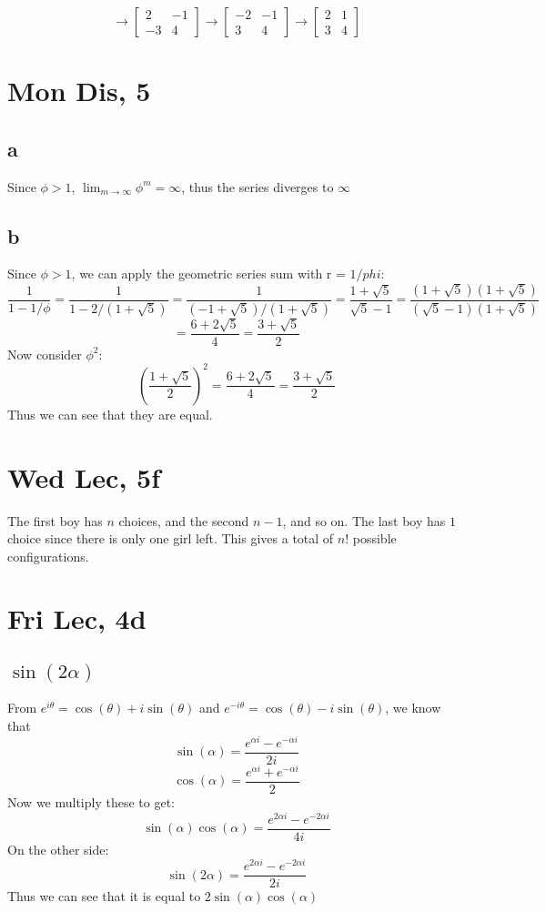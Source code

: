 \documentclass[12pt]{article}
\begin{document}
$$
\to
\begin{bmatrix}
2 & -1\\
-3 & 4
\end{bmatrix}
\to
\begin{bmatrix}
-2 & -1\\
3 & 4
\end{bmatrix}
\to
\begin{bmatrix}
2 & 1\\
3 & 4
\end{bmatrix}
$$

\section{Mon Dis, 5}
\subsection{a}
Since $\phi>1$, $\lim_{m\to \infty} \phi^m = \infty$, thus the series diverges to $\infty$

\subsection{b}
Since $\phi>1$, we can apply the geometric series sum with r = $1/phi$:
$$\frac{1}{1-1/\phi} = \frac{1}{1-2/(1+\sqrt5)} = \frac{1}{(-1+\sqrt5)/(1+\sqrt5)} = \frac{1+\sqrt5}{\sqrt5-1} = \frac{(1+\sqrt5)(1+\sqrt5)}{(\sqrt5-1)(1+\sqrt5)}$$
$$=\frac{6+2\sqrt5}{4} = \frac{3+\sqrt5}{2}$$
Now consider $\phi^2$:
$$(\frac{1+\sqrt5}{2})^2 = \frac{6+2\sqrt5}{4} = \frac{3+\sqrt5}{2}$$
Thus we can see that they are equal.
\newpage


\section{Wed Lec, 5f}
The first boy has $n$ choices, and the second $n-1$, and so on. The last boy has $1$ choice since there is only one girl left. This gives a total of $n!$ possible configurations.
\newpage

\section{Fri Lec, 4d}
\subsection{$\sin(2\alpha)$}
From $e^{i\theta}=\cos(\theta)+i\sin(\theta)$ and $e^{-i\theta}=\cos(\theta)-i\sin(\theta)$,
we know that
$$\sin(\alpha)=\frac{e^{\alpha i}-e^{-\alpha i}}{2i}$$
$$\cos(\alpha)=\frac{e^{\alpha i}+e^{-\alpha i}}{2}$$
Now we multiply these to get:
$$\sin(\alpha)\cos(\alpha)=\frac{e^{2\alpha i}-e^{-2\alpha i}}{4i}$$
On the other side:
$$\sin(2\alpha)=\frac{e^{2\alpha i}-e^{-2\alpha i}}{2i}$$
Thus we can see that it is equal to $2\sin(\alpha)\cos(\alpha)$
\end{document}
